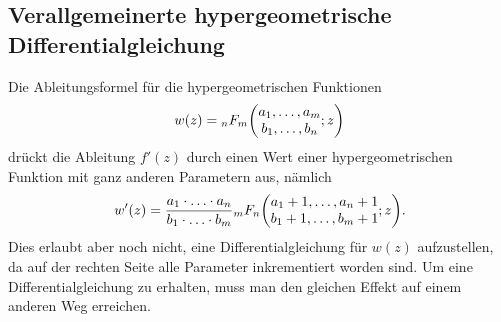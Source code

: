 %
%
\subsection{Verallgemeinerte hypergeometrische Differentialgleichung}
Die Ableitungsformel für die hypergeometrischen Funktionen
\[
w(z)
=
\mathstrut_nF_m
\biggl(\begin{matrix}a_1,\dots,a_m\\b_1,\dots,b_n\end{matrix};z\biggr)
\]
drückt die Ableitung $f'(z)$ durch einen Wert einer hypergeometrischen
Funktion mit ganz anderen Parametern aus, nämlich
\[
w'(z)
=
\frac{a_1\cdot\ldots\cdot a_n}{b_1\cdot\ldots\cdot b_m}
\mathstrut_mF_n\biggl(
\begin{matrix}a_1+1,\dots,a_n+1\\b_1+1,\dots,b_m+1\end{matrix};z
\biggr).
\]
Dies erlaubt aber noch nicht, eine Differentialgleichung für $w(z)$
aufzustellen, da auf der rechten Seite alle Parameter inkrementiert
worden sind.
Um eine Differentialgleichung zu erhalten, muss man den gleichen
Effekt auf einem anderen Weg erreichen.

